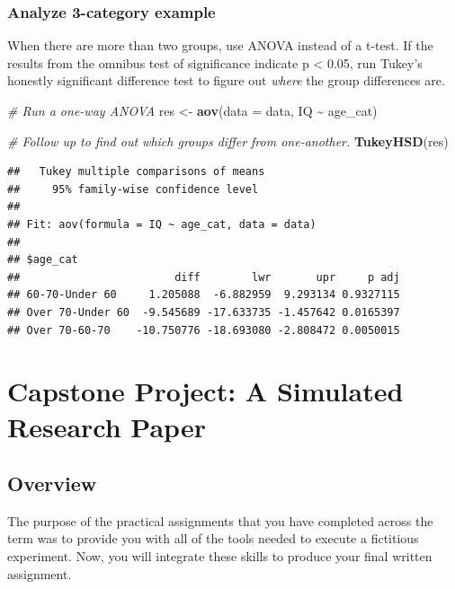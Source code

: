 \documentclass[
]{book}
\newenvironment{Shaded}{\begin{snugshade}}{\end{snugshade}}
\newcommand{\AttributeTok}[1]{\textcolor[rgb]{0.13,0.29,0.53}{#1}}
\newcommand{\CommentTok}[1]{\textcolor[rgb]{0.56,0.35,0.01}{\textit{#1}}}
\newcommand{\FunctionTok}[1]{\textcolor[rgb]{0.13,0.29,0.53}{\textbf{#1}}}
\newcommand{\NormalTok}[1]{#1}
\newcommand{\OtherTok}[1]{\textcolor[rgb]{0.56,0.35,0.01}{#1}}
\newcommand{\SpecialCharTok}[1]{\textcolor[rgb]{0.81,0.36,0.00}{\textbf{#1}}}
\begin{document}
\subsection{Analyze 3-category example}\label{analyze-3-category-example}

When there are more than two groups, use ANOVA instead of a t-test. If the results from the omnibus test of significance indicate p \textless{} 0.05, run Tukey's honestly significant difference test to figure out \emph{where} the group differences are.

\begin{Shaded}
\begin{Highlighting}[]
\CommentTok{\# Run a one{-}way ANOVA}
\NormalTok{res }\OtherTok{\textless{}{-}} \FunctionTok{aov}\NormalTok{(}\AttributeTok{data =}\NormalTok{ data, IQ }\SpecialCharTok{\textasciitilde{}}\NormalTok{ age\_cat)}


\CommentTok{\# Follow up to find out which groups differ from one{-}another. }
\FunctionTok{TukeyHSD}\NormalTok{(res)}
\end{Highlighting}
\end{Shaded}

\begin{verbatim}
##   Tukey multiple comparisons of means
##     95% family-wise confidence level
## 
## Fit: aov(formula = IQ ~ age_cat, data = data)
## 
## $age_cat
##                        diff        lwr       upr     p adj
## 60-70-Under 60     1.205088  -6.882959  9.293134 0.9327115
## Over 70-Under 60  -9.545689 -17.633735 -1.457642 0.0165397
## Over 70-60-70    -10.750776 -18.693080 -2.808472 0.0050015
\end{verbatim}

\chapter*{Capstone Project: A Simulated Research Paper}\label{capstone-project-a-simulated-research-paper}

\section*{Overview}\label{overview-1}

The purpose of the practical assignments that you have completed across the term was to provide you with all of the tools needed to execute a fictitious experiment. Now, you will integrate these skills to produce your final written assignment.
\end{document}

